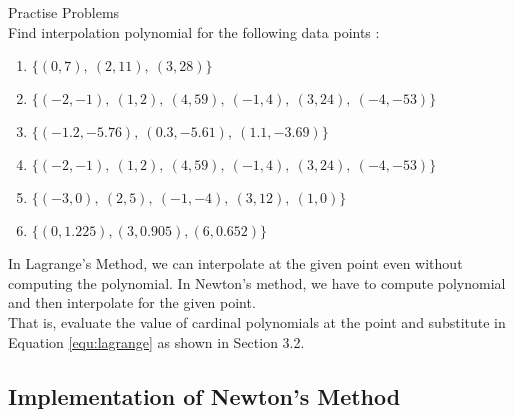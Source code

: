 \begin{remark}
	Practise Problems\\
	Find interpolation polynomial for the following data points :
	\begin{enumerate}
		\item $\{(0,7),\ (2,11),\ (3,28)\}$\\ \cite[Example 3.1]{kiusalaas}
		\item $\{(-2,-1),\ (1,2),\ (4,59),\ (-1,4),\ (3,24),\ (-4,-53) \}$\\ \cite[Example 3.2]{kiusalaas}
		\item $\{(-1.2,-5.76),\ (0.3,-5.61),\ (1.1,-3.69)\}$\\ \cite[Problem Set 3.1.1]{kiusalaas}
		\item $\{(-2,-1),\ (1,2),\ (4,59),\ (-1,4),\ (3,24),\ (-4,-53)\}$\\ \cite[Problem Set 3.1.6]{kiusalaas}
		\item $\{(-3,0),\ (2,5),\ (-1,-4),\ (3,12),\ (1,0)\}$\\ \cite[Problem Set 3.1.7]{kiusalaas}
		\item $\{(0,1.225),(3,0.905),(6,0.652)\}$\\ \cite[Problem Set 3.1.9]{kiusalaas}
	\end{enumerate}
\end{remark}

\begin{remark}
	In Lagrange's Method, we can interpolate at the given point even without computing the polynomial. In Newton's method, we have to compute polynomial and then interpolate for the given point.\\

	That is, evaluate the value of cardinal polynomials at the point and substitute in Equation \ref{equ:lagrange} as shown in Section 3.2.\cite[Example 3.1]{kiusalaas}
\end{remark}

\subsection{Implementation of Newton's Method}

